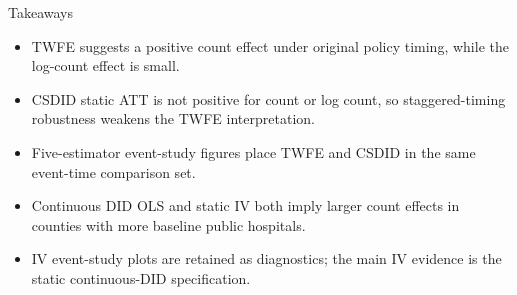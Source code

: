 \documentclass{beamer}
\begin{document}
\begin{frame}{Takeaways}
\small
\begin{itemize}\setlength\itemsep{0.65em}
    \item TWFE suggests a positive count effect under original policy timing, while the log-count effect is small.
    \item CSDID static ATT is not positive for count or log count, so staggered-timing robustness weakens the TWFE interpretation.
    \item Five-estimator event-study figures place TWFE and CSDID in the same event-time comparison set.
    \item Continuous DID OLS and static IV both imply larger count effects in counties with more baseline public hospitals.
    \item IV event-study plots are retained as diagnostics; the main IV evidence is the static continuous-DID specification.
\end{itemize}
\end{frame}
\end{document}
